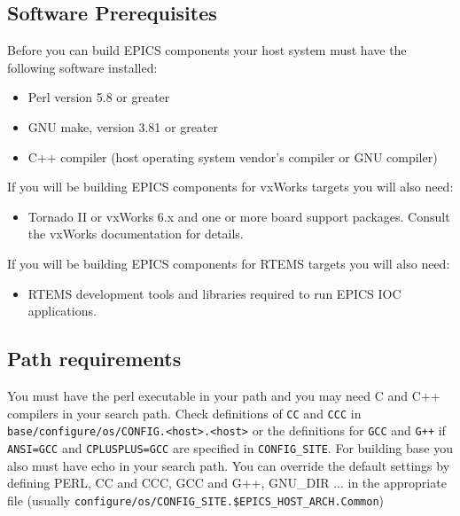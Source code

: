 \subsection{Software Prerequisites}

Before you can build EPICS components your host system must have the following software installed: 

\begin{itemize}
\item {}Perl version 5.8 or greater

\item {}GNU make, version 3.81 or greater

\item C++ compiler (host operating system vendor's compiler or GNU compiler)
\end{itemize}

If you will be building EPICS components for vxWorks targets you will also need:

\begin{itemize}
\item {}Tornado II or vxWorks 6.x and one or more board support packages. Consult the vxWorks documentation for details.

\end{itemize}

If you will be building EPICS components for RTEMS targets you will also need:

\begin{itemize}
\item {}RTEMS development tools and libraries required to run EPICS IOC applications.

\end{itemize}

\subsection{Path requirements}

You must have the perl executable in your path and you may need C and C++ compilers in your search path. Check 
definitions of \verb|CC| and \verb|CCC| in \verb|base/configure/os/CONFIG.<host>.<host>| or the definitions for \verb|GCC| and \verb|G++| if 
\verb|ANSI=GCC| and \verb|CPLUSPLUS=GCC| are specified in \verb|CONFIG_SITE|. For building base you also must have echo in your 
search path. You can override the default settings by defining PERL, CC and CCC, GCC and G++, GNU\_DIR ... in the 
appropriate file (usually \verb|configure/os/CONFIG_SITE.$EPICS_HOST_ARCH.Common|)

